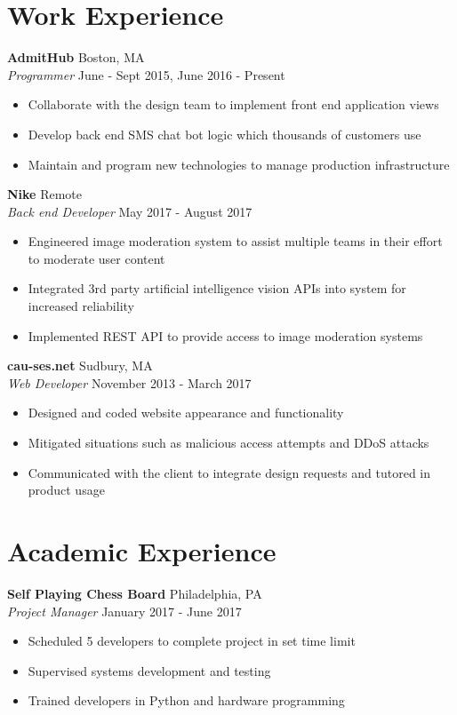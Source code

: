 \documentclass[10pt]{article}
\begin{document}
\begin{flushleft}
\section{Work Experience}
	\textbf{AdmitHub} \hfill Boston, MA \\
	\textit{Programmer} \hfill June - Sept 2015, June 2016 - Present \\
	\begin{itemize}
		\item Collaborate with the design team to implement front end application views
		\item Develop back end SMS chat bot logic which thousands of customers use
		\item Maintain and program new technologies to manage production infrastructure
	\end{itemize}

	\vspace{1em}
	\textbf{Nike} \hfill Remote \\
	\textit{Back end Developer} \hfill May 2017 - August 2017 \\
	\begin{itemize}
		\item Engineered image moderation system to assist multiple teams in their effort to moderate user content
		\item Integrated 3rd party artificial intelligence vision APIs into system for increased reliability
		\item Implemented REST API to provide access to image moderation systems
	\end{itemize}

	\vspace{1em}
	\textbf{cau-ses.net} \hfill Sudbury, MA \\
	\textit{Web Developer} \hfill November 2013 - March 2017 \\
	\begin{itemize}
		\item Designed and coded website appearance and functionality
		\item Mitigated situations such as malicious access attempts and DDoS attacks
		\item Communicated with the client to integrate design requests and tutored in product usage
	\end{itemize}

\section{Academic Experience}
	\textbf{Self Playing Chess Board} \hfill Philadelphia, PA \\
	\textit{Project Manager} \hfill January 2017 - June 2017 \\
	\begin{itemize}
		\item Scheduled 5 developers to complete project in set time limit
		\item Supervised systems development and testing
		\item Trained developers in Python and hardware programming
	\end{itemize}


\end{flushleft}
\end{document}
